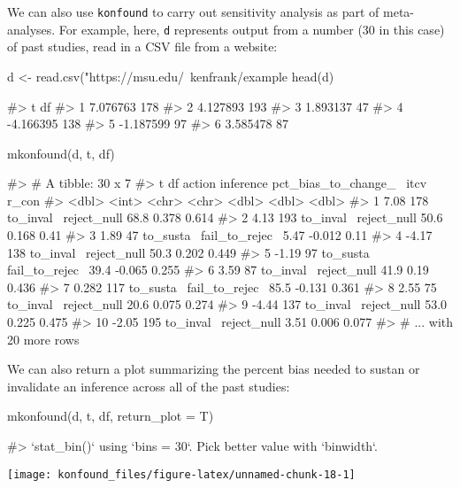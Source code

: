 We can also use \texttt{konfound} to carry out sensitivity analysis as
part of meta-analyses. For example, here, \texttt{d} represents output
from a number (30 in this case) of past studies, read in a CSV file from
a website:

\begin{Schunk}
\begin{Sinput}
d <- read.csv("https://msu.edu/~kenfrank/example%20dataset%20for%20mkonfound.csv")
head(d)
\end{Sinput}
\begin{Soutput}
#>           t  df
#> 1  7.076763 178
#> 2  4.127893 193
#> 3  1.893137  47
#> 4 -4.166395 138
#> 5 -1.187599  97
#> 6  3.585478  87
\end{Soutput}
\begin{Sinput}
mkonfound(d, t, df)
\end{Sinput}
\begin{Soutput}
#> # A tibble: 30 x 7
#>         t    df action    inference      pct_bias_to_change_~   itcv r_con
#>     <dbl> <int> <chr>     <chr>                         <dbl>  <dbl> <dbl>
#>  1  7.08    178 to_inval~ reject_null                   68.8   0.378 0.614
#>  2  4.13    193 to_inval~ reject_null                   50.6   0.168 0.41 
#>  3  1.89     47 to_susta~ fail_to_rejec~                 5.47 -0.012 0.11 
#>  4 -4.17    138 to_inval~ reject_null                   50.3   0.202 0.449
#>  5 -1.19     97 to_susta~ fail_to_rejec~                39.4  -0.065 0.255
#>  6  3.59     87 to_inval~ reject_null                   41.9   0.19  0.436
#>  7  0.282   117 to_susta~ fail_to_rejec~                85.5  -0.131 0.361
#>  8  2.55     75 to_inval~ reject_null                   20.6   0.075 0.274
#>  9 -4.44    137 to_inval~ reject_null                   53.0   0.225 0.475
#> 10 -2.05    195 to_inval~ reject_null                    3.51  0.006 0.077
#> # ... with 20 more rows
\end{Soutput}
\end{Schunk}

We can also return a plot summarizing the percent bias needed to sustan
or invalidate an inference across all of the past studies:

\begin{Schunk}
\begin{Sinput}
mkonfound(d, t, df, return_plot = T)
\end{Sinput}
\begin{Soutput}
#> `stat_bin()` using `bins = 30`. Pick better value with `binwidth`.
\end{Soutput}


\begin{center}\texttt{[image: konfound\_files/figure-latex/unnamed-chunk-18-1]} \end{center}

\end{Schunk}


